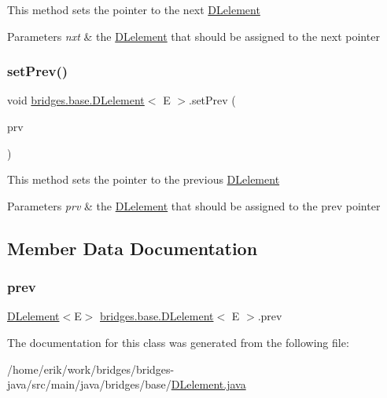 This method sets the pointer to the next \hyperlink{classbridges_1_1base_1_1_d_lelement}{D\+Lelement}


\begin{DoxyParams}{Parameters}
{\em nxt} & the \hyperlink{classbridges_1_1base_1_1_d_lelement}{D\+Lelement} that should be assigned to the next pointer \\
\hline
\end{DoxyParams}
\mbox{\label{classbridges_1_1base_1_1_d_lelement_a152a06add922290d48b2d4affc87d592}} 
\subsubsection{\texorpdfstring{set\+Prev()}{setPrev()}}
{\footnotesize\ttfamily void \hyperlink{classbridges_1_1base_1_1_d_lelement}{bridges.\+base.\+D\+Lelement}$<$ E $>$.set\+Prev (\begin{DoxyParamCaption}\item[{\hyperlink{classbridges_1_1base_1_1_d_lelement}{D\+Lelement}$<$ E $>$}]{prv }\end{DoxyParamCaption})}

This method sets the pointer to the previous \hyperlink{classbridges_1_1base_1_1_d_lelement}{D\+Lelement}


\begin{DoxyParams}{Parameters}
{\em prv} & the \hyperlink{classbridges_1_1base_1_1_d_lelement}{D\+Lelement} that should be assigned to the prev pointer \\
\hline
\end{DoxyParams}


\subsection{Member Data Documentation}
\mbox{\label{classbridges_1_1base_1_1_d_lelement_a6eba4876f820b75ac6bde01d7dea9da7}} 
\subsubsection{\texorpdfstring{prev}{prev}}
{\footnotesize\ttfamily \hyperlink{classbridges_1_1base_1_1_d_lelement}{D\+Lelement}$<$E$>$ \hyperlink{classbridges_1_1base_1_1_d_lelement}{bridges.\+base.\+D\+Lelement}$<$ E $>$.prev\hspace{0.3cm}{\ttfamily [protected]}}



The documentation for this class was generated from the following file\+:\begin{DoxyCompactItemize}
\item 
/home/erik/work/bridges/bridges-\/java/src/main/java/bridges/base/\hyperlink{_d_lelement_8java}{D\+Lelement.\+java}\end{DoxyCompactItemize}
